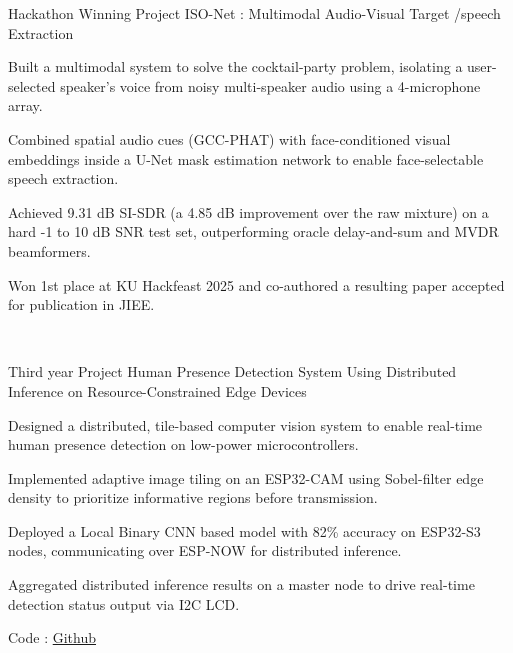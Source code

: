 

\begin{cventries}

     \cventry
    {Hackathon Winning Project}
    {ISO-Net : Multimodal Audio-Visual Target /speech Extraction }
    {}
    {}
    {
      \begin{cvitems}
        \item {Built a multimodal system to solve the cocktail-party problem, isolating a user-selected speaker's voice from noisy multi-speaker audio using a 4-microphone array.}
        \item {Combined spatial audio cues (GCC-PHAT) with face-conditioned visual embeddings inside a U-Net mask estimation network to enable face-selectable speech extraction.}
        \item {Achieved 9.31 dB SI-SDR (a 4.85 dB improvement over the raw mixture) on a hard -1 to 10 dB SNR test set, outperforming oracle delay-and-sum and MVDR beamformers.}
        \item {Won 1st place at KU Hackfeast 2025 and co-authored a resulting paper accepted for publication in JIEE.}
      \end{cvitems}
      ‎ 
    }
     \cventry
    {Third year Project}
    {Human Presence Detection System Using Distributed Inference on Resource-Constrained Edge Devices}
    {}
    {}
    {
      \begin{cvitems}
        \item {Designed a distributed, tile-based computer vision system to enable real-time human presence detection on low-power microcontrollers.}
        \item {Implemented adaptive image tiling on an ESP32-CAM using Sobel-filter edge density to prioritize informative regions before transmission.}
        \item {Deployed a Local Binary CNN based model with 82\% accuracy on ESP32-S3 nodes, communicating over ESP-NOW for distributed inference.}
        \item {Aggregated distributed inference results on a master node to drive real-time detection status output via I2C LCD.}
        \item {Code : \href{https://github.com/Ishwor-git/hpd_distrributed_infrencing}{Github}}
      \end{cvitems}
      ‎ 
    }


\end{cventries}
